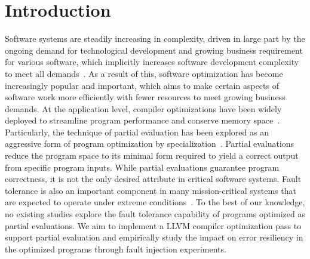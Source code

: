 \section{Introduction}

Software systems are steadily increasing in complexity, driven in large part by the ongoing demand for technological development and growing business requirement for various software, which implicitly increases software development complexity to meet all demands~\cite{Lyu}. 
As a result of this, software optimization has become increasingly popular and important, which aims to make certain aspects of software work more efficiently with fewer resources to meet growing business demands.
At the application level, compiler optimizations have been widely deployed to streamline program performance and conserve memory space~\cite{second}.
Particularly, the technique of partial evaluation has been explored as an aggressive form of program optimization by specialization~\cite{Jones}.
Partial evaluations reduce the program space to its minimal form required to yield a correct output from specific program inputs.
While partial evaluations guarantee program correctness, it is not the only desired attribute in critical software systems.
Fault tolerance is also an important component in many mission-critical systems that are expected to operate under extreme conditions~\cite{Somani}.
To the best of our knowledge, no existing studies explore the fault tolerance capability of programs optimized as partial evaluations.
We aim to implement a LLVM compiler optimization pass to support partial evaluation and empirically study the impact on error resiliency in the optimized programs through fault injection experiments.
